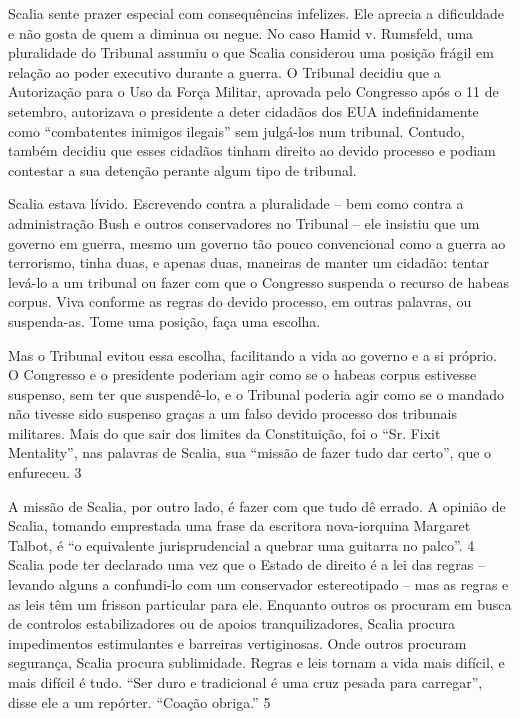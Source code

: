  
\par
 
Scalia sente prazer especial com consequências infelizes. Ele aprecia a dificuldade e não gosta de quem a diminua ou negue. No caso Hamid v. Rumsfeld, uma pluralidade do Tribunal assumiu o que Scalia considerou uma posição frágil em relação ao poder executivo durante a guerra. O Tribunal decidiu que a Autorização para o Uso da Força Militar, aprovada pelo Congresso após o 11 de setembro, autorizava o presidente a deter cidadãos dos EUA indefinidamente como “combatentes inimigos ilegais” sem julgá-los num tribunal. Contudo, também decidiu que esses cidadãos tinham direito ao devido processo e podiam contestar a sua detenção perante algum tipo de tribunal.
 
\par
 
Scalia estava lívido. Escrevendo contra a pluralidade – bem como contra a administração Bush e outros conservadores no Tribunal – ele insistiu que um governo em guerra, mesmo um governo tão pouco convencional como a guerra ao terrorismo, tinha duas, e apenas duas, maneiras de manter um cidadão: tentar levá-lo a um tribunal ou fazer com que o Congresso suspenda o recurso de habeas corpus. Viva conforme as regras do devido processo, em outras palavras, ou suspenda-as. Tome uma posição, faça uma escolha.
 
\par
 
Mas o Tribunal evitou essa escolha, facilitando a vida ao governo e a si próprio. O Congresso e o presidente poderiam agir como se o habeas corpus estivesse suspenso, sem ter que suspendê-lo, e o Tribunal poderia agir como se o mandado não tivesse sido suspenso graças a um falso devido processo dos tribunais militares. Mais do que sair dos limites da Constituição, foi o “Sr. Fixit Mentality”, nas palavras de Scalia, sua “missão de fazer tudo dar certo”, que o enfureceu.
 {\color{blue} 3}  

 
\par
 
A missão de Scalia, por outro lado, é fazer com que tudo dê errado. A opinião de Scalia, tomando emprestada uma frase da escritora nova-iorquina Margaret Talbot, é “o equivalente jurisprudencial a quebrar uma guitarra no palco”.
 {\color{blue} 4}  
Scalia pode ter declarado uma vez que o Estado de direito é a lei das regras – levando alguns a confundi-lo com um conservador estereotipado – mas as regras e as leis têm um frisson particular para ele. Enquanto outros os procuram em busca de controlos estabilizadores ou de apoios tranquilizadores, Scalia procura impedimentos estimulantes e barreiras vertiginosas. Onde outros procuram segurança, Scalia procura sublimidade. Regras e leis tornam a vida mais difícil, e mais difícil é tudo. “Ser duro e tradicional é uma cruz pesada para carregar”, disse ele a um repórter. “Coação obriga.”
 {\color{blue} 5}  

